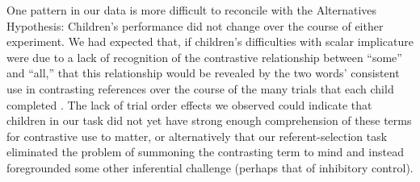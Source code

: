 \documentclass[10pt,letterpaper]{article}
\begin{document}
One pattern in our data is more difficult to reconcile with the Alternatives Hypothesis: Children's performance did not change over the course of either experiment. We had expected that, if children's difficulties with scalar implicature were due to a lack of recognition of the contrastive relationship between ``some'' and ``all,'' that this relationship would be revealed by the two words' consistent use in contrasting references over the course of the many trials that each child completed  \cite{skordos2014}. 
The lack of trial order effects we observed could indicate that children in our task did not yet have strong enough comprehension of these terms for contrastive use to matter, or alternatively that our referent-selection task eliminated the problem of summoning the contrasting term to mind and instead foregrounded some other inferential challenge (perhaps that of inhibitory control). 



\end{document}
